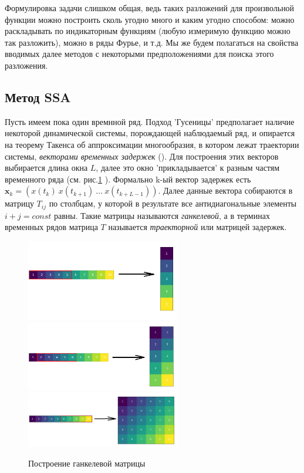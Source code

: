 	    	Формулировка задачи слишком общая, ведь таких разложений для произвольной функции можно построить сколь угодно много и каким угодно способом: можно раскладывать по индикаторным функциям (любую измеримую функцию можно так разложить), можно в ряды Фурье, и т.д. Мы же будем полагаться на свойства вводимых далее методов с некоторыми предположениями для поиска этого разложения.
	    
	    	\subsection*{Метод SSA}
	    	
	    	Пусть имеем пока один времнной ряд. Подход 'Гусеницы' предполагает наличие некоторой динамической системы, порождающей наблюдаемый ряд, и опирается на теорему Такенса об аппроксимации многообразия, в котором лежат траектории системы, \textit{векторами временных задержек} (\cite{citeulike:2735031}). Для построения этих векторов выбирается длина окна $ L $, далее это окно 'прикладывается' к разным частям временного ряда (см. рис.\ref{pic:hankel_build} ). Формально k-ый вектор задержек есть $ \mathbf{x}_k = ( x(t_k) \  x(t_{k+1}) \  \ldots \  x(t_{k + L - 1}) ) $. Далее данные вектора собираются в матрицу $ T_{ij} $ по столбцам, у которой в результате все антидиагональные элементы $ i + j = const $ равны. Такие матрицы называются \textit{ганкелевой}, а в терминах временных рядов матрица $ T $ называется \textit{траекторной} или матрицей задержек.
	    	
	    	\begin{figure}
	    		\centering
	    		\includegraphics[width=0.6\textwidth, keepaspectratio]{../figs/first_round}
	    		\includegraphics[width=0.6\textwidth, keepaspectratio]{../figs/second_round.png}
	    		\includegraphics[width=0.6\textwidth, keepaspectratio]{../figs/last_round.png}
	    		\caption{Построение ганкелевой матрицы}\label{pic:hankel_build}
	    	\end{figure}
	    	

